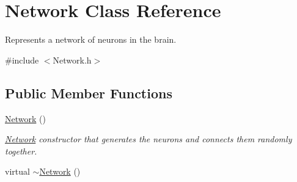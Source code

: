 \hypertarget{classNetwork}{\section{Network Class Reference}
\label{classNetwork}
}


Represents a network of neurons in the brain.  




{\ttfamily \#include $<$Network.\-h$>$}

\subsection*{Public Member Functions}
\begin{DoxyCompactItemize}
\item 
\hypertarget{classNetwork_a3cc2fb4f8fa4d507077e8da85ce5a1c8}{\hyperlink{classNetwork_a3cc2fb4f8fa4d507077e8da85ce5a1c8}{Network} ()}\label{classNetwork_a3cc2fb4f8fa4d507077e8da85ce5a1c8}

\begin{DoxyCompactList}\small\item\em \hyperlink{classNetwork}{Network} constructor that generates the neurons and connects them randomly together. \end{DoxyCompactList}\item 
\hypertarget{classNetwork_a7a4e19cdb4bf0c7ecf82baa643831492}{virtual \hyperlink{classNetwork_a7a4e19cdb4bf0c7ecf82baa643831492}{$\sim$\-Network} ()}\label{classNetwork_a7a4e19cdb4bf0c7ecf82baa643831492}


\end{DoxyCompactItemize}
